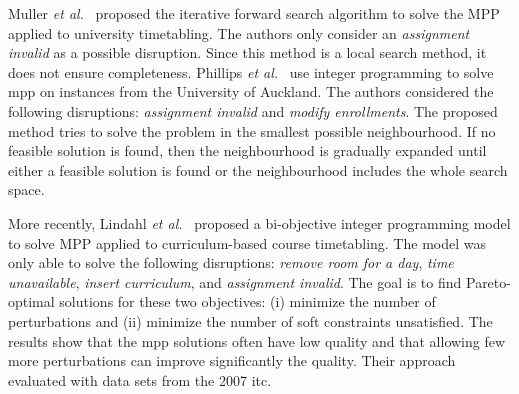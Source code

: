 \documentclass[runningheads]{llncs}
\begin{document}

Muller \emph{et al.}~\cite{DBLP:conf/patat/MullerRB04} proposed the iterative forward search algorithm to solve the MPP applied to university timetabling. The authors only consider an \textit{assignment invalid} as a possible disruption. Since this method is a local search method, it does not ensure completeness. Phillips \emph{et al.}~\cite{APhillips2017} use integer programming to solve \gls{mpp} on instances from the University of Auckland. The authors considered the following disruptions: \textit{assignment invalid} and \textit{modify enrollments}. The proposed method tries to solve the problem in the smallest possible neighbourhood. If no feasible solution is found, then the neighbourhood is gradually expanded until either a feasible solution is found or the neighbourhood includes the whole search space. 

More recently, Lindahl \emph{et al.}~\cite{LINDAHL2019} proposed a bi-objective integer programming model to solve MPP applied to curriculum-based course timetabling. The model was only able to solve the following disruptions: \textit{remove room for a day}, \textit{time unavailable}, \textit{insert curriculum}, and \textit{assignment invalid}. The goal is to find Pareto-optimal solutions for these two objectives: (i) minimize the number of perturbations and (ii) minimize the number of soft constraints unsatisfied. The results show that the \gls{mpp} solutions often have low quality and that allowing  few more perturbations can improve significantly the quality. Their approach evaluated with data sets from the 2007 \gls{itc}. 
\end{document}
